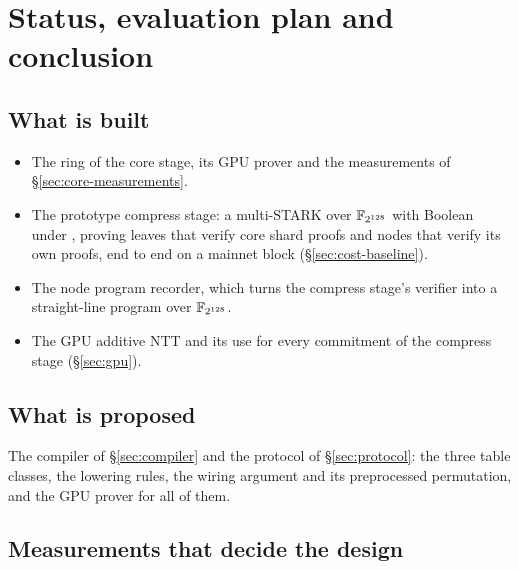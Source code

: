 \section{Status, evaluation plan and conclusion}\label{sec:status}

\subsection{What is built}

\begin{itemize}
  \item The \Blake{} ring of the core stage, its GPU prover and the measurements of \S\ref{sec:core-measurements}.
  \item The prototype compress stage: a multi-STARK over $\mathbb{F}_{2^{128}}$ with Boolean \WHIR{} under \Blake{}, proving leaves that verify core shard proofs and nodes that verify its own proofs, end to end on a mainnet block (\S\ref{sec:cost-baseline}).
  \item The node program recorder, which turns the compress stage's verifier into a straight-line program over $\mathbb{F}_{2^{128}}$.
  \item The GPU additive NTT and its use for every commitment of the compress stage (\S\ref{sec:gpu}).
\end{itemize}

\subsection{What is proposed}

The compiler of \S\ref{sec:compiler} and the protocol of \S\ref{sec:protocol}: the three table classes, the lowering rules, the wiring argument and its preprocessed permutation, and the GPU prover for all of them.

\subsection{Measurements that decide the design}

